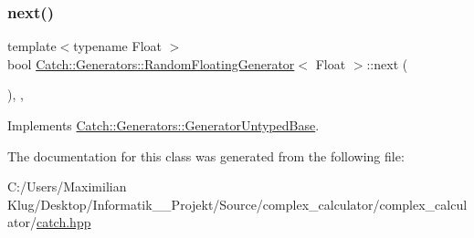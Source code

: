 \mbox{\label{class_catch_1_1_generators_1_1_random_floating_generator_a6a65e5f16abd884f58c31581b2a0d6db}} 
\subsubsection{\texorpdfstring{next()}{next()}}
{\footnotesize\ttfamily template$<$typename Float $>$ \\
bool \mbox{\hyperlink{class_catch_1_1_generators_1_1_random_floating_generator}{Catch\+::\+Generators\+::\+Random\+Floating\+Generator}}$<$ Float $>$\+::next (\begin{DoxyParamCaption}{ }\end{DoxyParamCaption})\hspace{0.3cm}{\ttfamily [inline]}, {\ttfamily [override]}, {\ttfamily [virtual]}}



Implements \mbox{\hyperlink{class_catch_1_1_generators_1_1_generator_untyped_base_aeed3c0cd6233c5f553549e453b8d6638}{Catch\+::\+Generators\+::\+Generator\+Untyped\+Base}}.



The documentation for this class was generated from the following file\+:\begin{DoxyCompactItemize}
\item 
C\+:/\+Users/\+Maximilian Klug/\+Desktop/\+Informatik\+\_\+\_\+\+Projekt/\+Source/complex\+\_\+calculator/complex\+\_\+calculator/\mbox{\hyperlink{catch_8hpp}{catch.\+hpp}}\end{DoxyCompactItemize}
